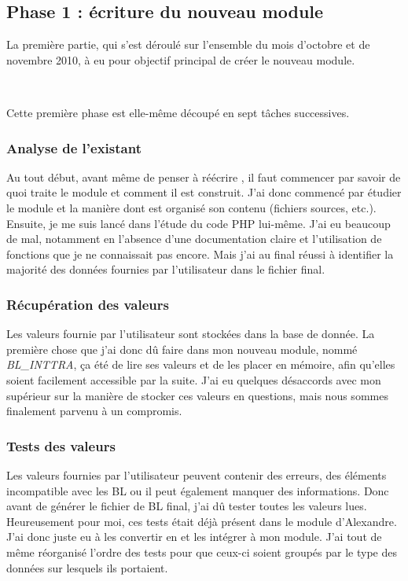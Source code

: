 \subsection{Phase 1 : écriture du nouveau module}
La première partie, qui s'est déroulé sur l'ensemble du mois d'octobre et de novembre 2010, à eu pour objectif principal de créer le nouveau module.

~

Cette première phase est elle-même découpé en sept tâches successives.

\subsubsection{Analyse de l'existant}
Au tout début, avant même de penser à réécrire \pireus, il faut commencer par savoir de quoi traite le module et comment il est construit. J'ai donc commencé par étudier le module et la manière dont est organisé son contenu (fichiers sources, etc.). Ensuite, je me suis lancé dans l'étude du code PHP lui-même. J'ai eu beaucoup de mal, notamment en l'absence d'une documentation claire et l'utilisation de fonctions que je ne connaissait pas encore. Mais j'ai au final réussi à identifier la majorité des données fournies par l'utilisateur dans le fichier final.

\subsubsection{Récupération des valeurs}
Les valeurs fournie par l'utilisateur sont stockées dans la base de donnée. La première chose que j'ai donc dû faire dans mon nouveau module, nommé \emph{BL\_INTTRA}, ça été de lire ses valeurs et de les placer en mémoire, afin qu'elles soient facilement accessible par la suite. J'ai eu quelques désaccords avec mon supérieur sur la manière de stocker ces valeurs en questions, mais nous sommes finalement parvenu à un compromis.

\subsubsection{Tests des valeurs}
Les valeurs fournies par l'utilisateur peuvent contenir des erreurs, des éléments incompatible avec les BL ou il peut également manquer des informations. Donc avant de générer le fichier de BL final, j'ai dû tester toutes les valeurs lues. Heureusement pour moi, ces tests était déjà présent dans le module d'Alexandre. J'ai donc juste eu à les convertir en \vb et les intégrer à mon module. J'ai tout de même réorganisé l'ordre des tests pour que ceux-ci soient groupés par le type des données sur lesquels ils portaient.


